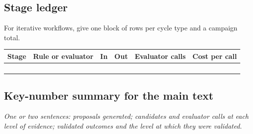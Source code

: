 \documentclass[10pt]{article}
\begin{document}
\subsection*{Stage ledger}
For iterative workflows, give one block of rows per cycle type and a campaign total.

\begin{longtable}{@{}L{0.16\textwidth} L{0.30\textwidth} L{0.08\textwidth} L{0.08\textwidth} L{0.14\textwidth} L{0.14\textwidth}@{}}
\toprule
\textbf{Stage} & \textbf{Rule or evaluator} & \textbf{In} & \textbf{Out} & \textbf{Evaluator calls} & \textbf{Cost per call}\\
\midrule
 & & & & & \\[1.2em]
 & & & & & \\[1.2em]
 & & & & & \\[1.2em]
 & & & & & \\[1.2em]
\bottomrule
\end{longtable}

\subsection*{Key-number summary for the main text}
\emph{One or two sentences: proposals generated; candidates and evaluator calls at each level of evidence; validated outcomes and the level at which they were validated.}
\end{document}
